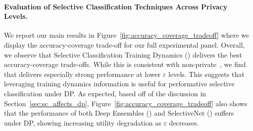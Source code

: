 \paragraph{Evaluation of Selective Classification Techniques Across Privacy Levels.}

We report our main results in Figure~\ref{fig:accuracy_coverage_tradeoff} where we display the accuracy-coverage trade-off for our full experimental panel. Overall, we observe that Selective Classification Training Dynamics (\sctd) delivers the best accuracy-coverage trade-offs. While this is consistent with non-private~\citep{rabanser2022selective}, we find that \sctd delivers especially strong performance at lower $\varepsilon$ levels. This suggests that leveraging training dynamics information is useful for performative selective classification under DP. As expected, based off of the discussion in Section~\ref{sec:sc_affects_dp}, Figure~\ref{fig:accuracy_coverage_tradeoff} also shows that the performance of both Deep Ensembles (\de) and SelectiveNet (\sn) suffers under DP, showing increasing utility degradation as $\varepsilon$ decreases. 

